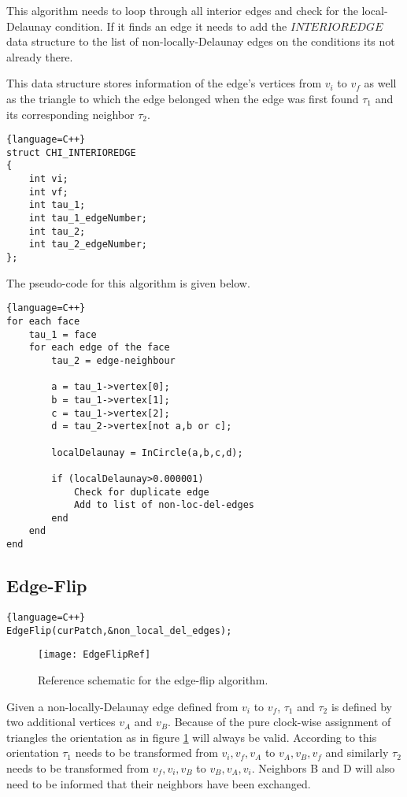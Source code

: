 \documentclass[11pt,letterpaper,titlepage]{article}
\begin{document}
\noindent This algorithm needs to loop through all interior edges and check for the local-Delaunay condition. If it finds an edge it needs to add the $INTERIOREDGE$ data structure to the list of non-locally-Delaunay edges on the conditions its not already there.

This data structure stores information of the edge's vertices from $v_i$ to $v_f$ as well as the triangle to which the edge belonged when the edge was first found $\tau_1$ and its corresponding neighbor $\tau_2$.
\newline

\begin{lstlisting}{language=C++}
struct CHI_INTERIOREDGE
{
	int vi;
	int vf;
	int tau_1;
	int tau_1_edgeNumber;
	int tau_2;
	int tau_2_edgeNumber;
};
\end{lstlisting}

\noindent The pseudo-code for this algorithm is given below.

\begin{lstlisting}{language=C++}
for each face
	tau_1 = face
	for each edge of the face
		tau_2 = edge-neighbour
		
		a = tau_1->vertex[0];
		b = tau_1->vertex[1];
		c = tau_1->vertex[2];
		d = tau_2->vertex[not a,b or c];
		
		localDelaunay = InCircle(a,b,c,d);
		
		if (localDelaunay>0.000001)
			Check for duplicate edge
			Add to list of non-loc-del-edges
		end
	end
end
\end{lstlisting}

\subsection{Edge-Flip}

\begin{lstlisting}{language=C++}
EdgeFlip(curPatch,&non_local_del_edges);
\end{lstlisting}

\begin{figure}[h]
\centering
\texttt{[image: EdgeFlipRef]}
\caption{Reference schematic for the edge-flip algorithm.}
\label{fig:EdgeFlipRef}
\end{figure}

\noindent Given a non-locally-Delaunay edge defined from $v_i$ to $v_f$, $\tau_1$ and $\tau_2$ is defined by two additional vertices $v_A$ and $v_B$. Because of the pure clock-wise assignment of triangles the orientation as in figure \ref{fig:EdgeFlipRef} will always be valid. According to this orientation $\tau_1$ needs to be transformed from $v_i,v_f,v_A$ to $v_A,v_B,v_f$ and similarly $\tau_2$ needs to be transformed from $v_f,v_i,v_B$ to $v_B,v_A,v_i$. Neighbors B and D will also need to be informed that their neighbors have been exchanged.
\end{document}
